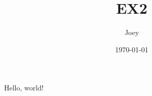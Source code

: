 \documentclass{article}
\title{EX2}
\author{Joey}
\date{\today}
\begin{document}
Hello, world!
\end{document}

